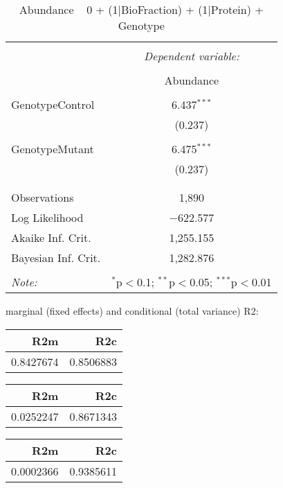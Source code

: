 \documentclass[11pt]{report}
\begin{document}
\begin{table}[!htbp] \centering 
  \caption{Abundance ~ 0 + (1|BioFraction) + (1|Protein) + Genotype} 
  \label{} 
\begin{tabular}{@{\extracolsep{5pt}}lc} 
\\[-1.8ex]\hline 
\hline \\[-1.8ex] 
 & \multicolumn{1}{c}{\textit{Dependent variable:}} \\ 
\cline{2-2} 
\\[-1.8ex] & Abundance \\ 
\hline \\[-1.8ex] 
 GenotypeControl & 6.437$^{***}$ \\ 
  & (0.237) \\ 
  & \\ 
 GenotypeMutant & 6.475$^{***}$ \\ 
  & (0.237) \\ 
  & \\ 
\hline \\[-1.8ex] 
Observations & 1,890 \\ 
Log Likelihood & $-$622.577 \\ 
Akaike Inf. Crit. & 1,255.155 \\ 
Bayesian Inf. Crit. & 1,282.876 \\ 
\hline 
\hline \\[-1.8ex] 
\textit{Note:}  & \multicolumn{1}{r}{$^{*}$p$<$0.1; $^{**}$p$<$0.05; $^{***}$p$<$0.01} \\ 
\end{tabular} 
\end{table} 
marginal (fixed effects) and conditional (total variance) R2:

\begin{tabular}{r|r}
\hline
R2m & R2c\\
\hline
0.8427674 & 0.8506883\\
\hline
\end{tabular}

\begin{tabular}{r|r}
\hline
R2m & R2c\\
\hline
0.0252247 & 0.8671343\\
\hline
\end{tabular}

\begin{tabular}{r|r}
\hline
R2m & R2c\\
\hline
0.0002366 & 0.9385611\\
\hline
\end{tabular}
\end{document}
